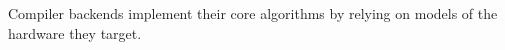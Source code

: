 Compiler backends
  implement their core algorithms
  by relying on models
  of the hardware they target.
